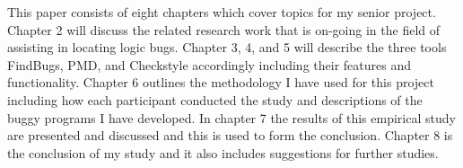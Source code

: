 This paper consists of eight chapters which cover topics for my senior project. Chapter 2 will discuss the related research work that is on-going in the field of assisting in locating logic bugs. Chapter 3, 4, and 5 will describe the three tools FindBugs, PMD, and Checkstyle accordingly including their features and functionality. Chapter 6 outlines the methodology I have used for this project including how each participant conducted the study and descriptions of the buggy programs I have developed. In chapter 7 the results of this empirical study are presented and discussed and this is used to form the conclusion. Chapter 8 is the conclusion of my study and it also includes suggestions for further studies.     
